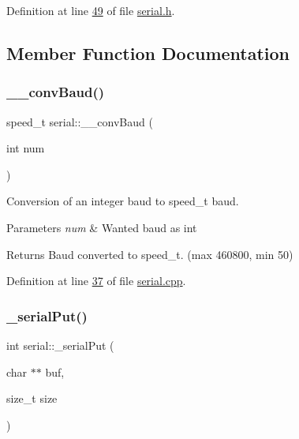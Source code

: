 Definition at line \mbox{\hyperlink{serial_8h_source_l00049}{49}} of file \mbox{\hyperlink{serial_8h_source}{serial.\+h}}.



\subsection{Member Function Documentation}
\mbox{\label{classserial_a3e2ffceef5cd07f53b724da38433a6f0}} 
\subsubsection{\texorpdfstring{\+\_\+\+\_\+conv\+Baud()}{\_\_convBaud()}}
{\footnotesize\ttfamily speed\+\_\+t serial\+::\+\_\+\+\_\+conv\+Baud (\begin{DoxyParamCaption}\item[{int}]{num }\end{DoxyParamCaption})\hspace{0.3cm}{\ttfamily [private]}}



Conversion of an integer baud to speed\+\_\+t baud. 


\begin{DoxyParams}{Parameters}
{\em num} & Wanted baud as int\\
\hline
\end{DoxyParams}
\begin{DoxyReturn}{Returns}
Baud converted to speed\+\_\+t. (max 460800, min 50) 
\end{DoxyReturn}


Definition at line \mbox{\hyperlink{serial_8cpp_source_l00037}{37}} of file \mbox{\hyperlink{serial_8cpp_source}{serial.\+cpp}}.

\mbox{\label{classserial_a4c9d6896cfd99ee1f521bbba7a35cac7}} 
\subsubsection{\texorpdfstring{\+\_\+serial\+Put()}{\_serialPut()}}
{\footnotesize\ttfamily int serial\+::\+\_\+serial\+Put (\begin{DoxyParamCaption}\item[{char $\ast$$\ast$}]{buf,  }\item[{size\+\_\+t}]{size }\end{DoxyParamCaption})\hspace{0.3cm}{\ttfamily [private]}}



